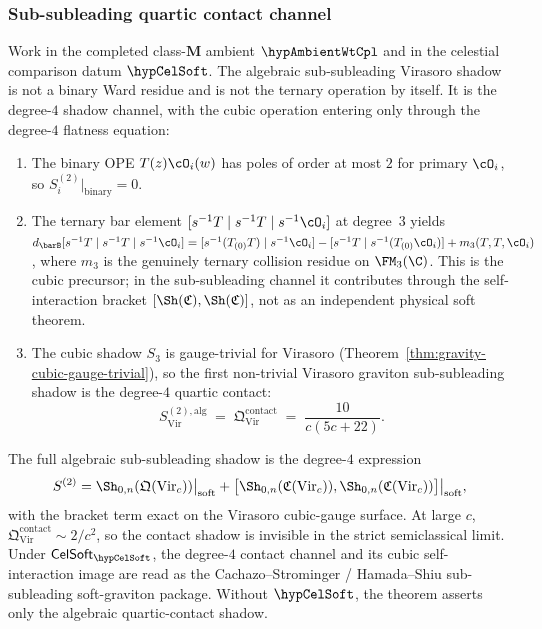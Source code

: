 \subsubsection*{Sub-subleading quartic contact channel}

\begin{theorem}
\label{thm:gravity-chy-from-ainf}
Work in the completed class-\(\mathbf M\) ambient
\(\hypAmbientWtCpl\) and in the celestial comparison datum
\(\hypCelSoft\).  The algebraic sub-subleading Virasoro shadow is
not a binary Ward residue and is not the ternary operation by itself.
It is the degree-$4$ shadow channel, with the cubic operation entering
only through the degree-$4$ flatness equation:
\begin{enumerate}[label=\textup{(\roman*)}]
\item The binary OPE $T(z)\cO_i(w)$ has poles of order at
 most $2$ for primary $\cO_i$, so
 $S^{(2)}_i|_{\text{binary}} = 0$.
\item The ternary bar element
 $[s^{-1}T \mid s^{-1}T \mid s^{-1}\cO_i]$ at degree~$3$
 yields
 $d_{\barB}[s^{-1}T \mid s^{-1}T \mid s^{-1}\cO_i]
 = [s^{-1}(T_{(0)}T) \mid s^{-1}\cO_i]
 - [s^{-1}T \mid s^{-1}(T_{(0)}\cO_i)]
 + m_3(T, T, \cO_i)$,
 where \(m_3\) is the genuinely ternary collision residue on
 \(\FM_3(\C)\).  This is the cubic precursor; in the
 sub-subleading channel it contributes through the self-interaction
 bracket \([\Sh(\mathfrak C),\Sh(\mathfrak C)]\), not as an
 independent physical soft theorem.
\item The cubic shadow $S_3$ is gauge-trivial for Virasoro
 (Theorem~\ref{thm:gravity-cubic-gauge-trivial}), so the
 first non-trivial Virasoro graviton sub-subleading shadow is the
 degree-$4$ quartic
 contact:
 \begin{equation}\label{eq:gravity-sub-subleading-contact}
 S^{(2),\mathrm{alg}}_{\mathrm{Vir}}
 \;=\;
 \mathfrak{Q}^{\mathrm{contact}}_{\mathrm{Vir}}
 \;=\;
 \frac{10}{c(5c+22)}.
 \end{equation}
\end{enumerate}
The full algebraic sub-subleading shadow is the degree-$4$ expression
\[
S^{(2)}
=
\Sh_{0,n}(\mathfrak Q(\mathrm{Vir}_c))\big|_{\mathrm{soft}}
+
\bigl[\Sh_{0,n}(\mathfrak C(\mathrm{Vir}_c)),
\Sh_{0,n}(\mathfrak C(\mathrm{Vir}_c))\bigr]\big|_{\mathrm{soft}},
\]
with the bracket term exact on the Virasoro cubic-gauge surface.  At
large \(c\),
\(\mathfrak Q^{\mathrm{contact}}_{\mathrm{Vir}}\sim 2/c^2\), so the
contact shadow is invisible in the strict semiclassical limit.  Under
\(\mathsf{CelSoft}_{\hypCelSoft}\), the degree-$4$ contact channel and
its cubic self-interaction image are read as the
Cachazo--Strominger / Hamada--Shiu sub-subleading
soft-graviton package.  Without \(\hypCelSoft\), the theorem asserts
only the algebraic quartic-contact shadow.
\end{theorem}

